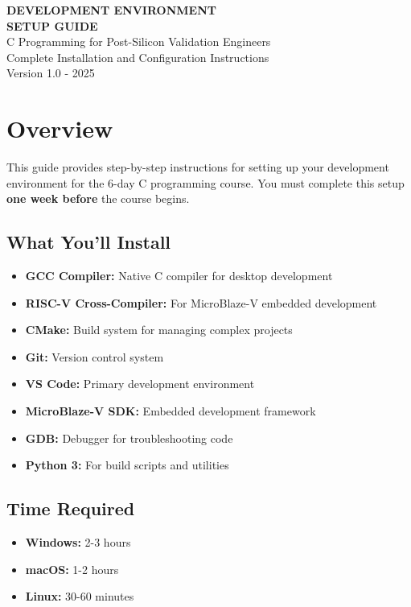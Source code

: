 \documentclass[11pt,a4paper]{article}
\begin{document}
\begin{center}
    {\Huge\bfseries\color{codeblue} DEVELOPMENT ENVIRONMENT}\\[0.3cm]
    {\Huge\bfseries\color{codeblue} SETUP GUIDE}\\[0.5cm]
    {\Large C Programming for Post-Silicon Validation Engineers}\\[0.3cm]
    {\large Complete Installation and Configuration Instructions}\\[0.2cm]
    {\normalsize Version 1.0 - 2025}
\end{center}

\vspace{1cm}

\section{Overview}

This guide provides step-by-step instructions for setting up your development environment for the 6-day C programming course. You must complete this setup \textbf{one week before} the course begins.

\subsection{What You'll Install}
\begin{itemize}
    \item \textbf{GCC Compiler:} Native C compiler for desktop development
    \item \textbf{RISC-V Cross-Compiler:} For MicroBlaze-V embedded development
    \item \textbf{CMake:} Build system for managing complex projects
    \item \textbf{Git:} Version control system
    \item \textbf{VS Code:} Primary development environment
    \item \textbf{MicroBlaze-V SDK:} Embedded development framework
    \item \textbf{GDB:} Debugger for troubleshooting code
    \item \textbf{Python 3:} For build scripts and utilities
\end{itemize}

\subsection{Time Required}
\begin{itemize}
    \item \textbf{Windows:} 2-3 hours
    \item \textbf{macOS:} 1-2 hours
    \item \textbf{Linux:} 30-60 minutes
\end{itemize}
\end{document}
